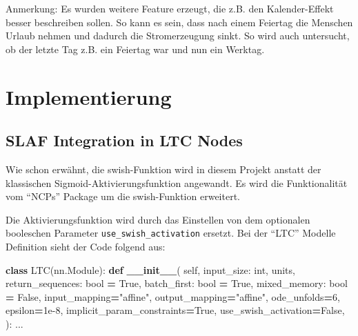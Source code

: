 \documentclass[11pt,ngerman,a4paper,]{article}
\newenvironment{Shaded}{\begin{snugshade}}{\end{snugshade}}
\newcommand{\BuiltInTok}[1]{#1}
\newcommand{\DecValTok}[1]{\textcolor[rgb]{0.00,0.00,0.81}{#1}}
\newcommand{\FloatTok}[1]{\textcolor[rgb]{0.00,0.00,0.81}{#1}}
\newcommand{\FunctionTok}[1]{\textcolor[rgb]{0.13,0.29,0.53}{\textbf{#1}}}
\newcommand{\KeywordTok}[1]{\textcolor[rgb]{0.13,0.29,0.53}{\textbf{#1}}}
\newcommand{\NormalTok}[1]{#1}
\newcommand{\OperatorTok}[1]{\textcolor[rgb]{0.81,0.36,0.00}{\textbf{#1}}}
\newcommand{\StringTok}[1]{\textcolor[rgb]{0.31,0.60,0.02}{#1}}
\newcommand{\VariableTok}[1]{\textcolor[rgb]{0.00,0.00,0.00}{#1}}
\begin{document}
Anmerkung: Es wurden weitere Feature erzeugt, die z.B. den Kalender-Effekt besser beschreiben sollen. So kann es sein, dass nach einem Feiertag die Menschen Urlaub nehmen und dadurch die Stromerzeugung sinkt. So wird auch untersucht, ob der letzte Tag z.B. ein Feiertag war und nun ein Werktag.

\clearpage
\newpage

\section{Implementierung}\label{implementierung}

\subsection{SLAF Integration in LTC Nodes}\label{slaf-integration-in-ltc-nodes}

Wie schon erwähnt, die swish-Funktion wird in diesem Projekt anstatt der klassischen Sigmoid-Aktivierungsfunktion angewandt. Es wird die Funktionalität vom ``NCPs'' Package um die swish-Funktion erweitert.

Die Aktivierungsfunktion wird durch das Einstellen von dem optionalen booleschen Parameter \texttt{use\_swish\_activation} ersetzt. Bei der ``LTC'' Modelle Definition sieht der Code folgend aus:

\singlespacing

\begin{Shaded}
\begin{Highlighting}[numbers=left,,]
\KeywordTok{class}\NormalTok{ LTC(nn.Module):}
    \KeywordTok{def} \FunctionTok{\_\_init\_\_}\NormalTok{(}
        \VariableTok{self}\NormalTok{,}
\NormalTok{        input\_size: }\BuiltInTok{int}\NormalTok{,}
\NormalTok{        units,}
\NormalTok{        return\_sequences: }\BuiltInTok{bool} \OperatorTok{=} \VariableTok{True}\NormalTok{,}
\NormalTok{        batch\_first: }\BuiltInTok{bool} \OperatorTok{=} \VariableTok{True}\NormalTok{,}
\NormalTok{        mixed\_memory: }\BuiltInTok{bool} \OperatorTok{=} \VariableTok{False}\NormalTok{,}
\NormalTok{        input\_mapping}\OperatorTok{=}\StringTok{"affine"}\NormalTok{,}
\NormalTok{        output\_mapping}\OperatorTok{=}\StringTok{"affine"}\NormalTok{,}
\NormalTok{        ode\_unfolds}\OperatorTok{=}\DecValTok{6}\NormalTok{,}
\NormalTok{        epsilon}\OperatorTok{=}\FloatTok{1e{-}8}\NormalTok{,}
\NormalTok{        implicit\_param\_constraints}\OperatorTok{=}\VariableTok{True}\NormalTok{,}
\NormalTok{        use\_swish\_activation}\OperatorTok{=}\VariableTok{False}\NormalTok{,}
\NormalTok{    ):}
\NormalTok{      ...}
\end{Highlighting}
\end{Shaded}
\end{document}

